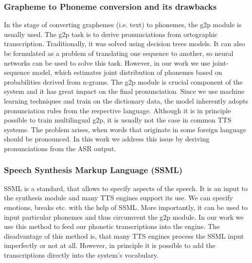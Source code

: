 \subsubsection*{Grapheme to Phoneme conversion and its drawbacks}
In the stage of converting graphemes (i.e. text) to phonemes, the g2p module is usually used.
The g2p task is to derive pronunciations from ortographic transcription.
Traditionally, it was solved using decision trees models.
It can also be formulated as a problem of translating one sequence to another, so neural networks can be used to solve this task\cite{yao2015sequence}.
However, in our work we use joint-sequence model\cite{bisani2008joint}, which estimates joint distribution of phonemes based on probabilities derived from n-grams.
The g2p module is crucial component of the system and it has great impact on the final pronunciation.
Since we use machine learning techniques and train on the dictionary data, the model inherently adopts pronunciation rules from the respective language.
Although it is in principle possible to  train multilingual g2p\cite{schlippe2012grapheme}, it is usually not the case in common TTS systems.
The problem arises, when words that originate in some foreign language should be pronounced.
In this work we address this issue by deriving pronunciations from the ASR output.
\subsubsection*{Speech Synthesis Markup Language (SSML)\cite{taylor1997ssml}}
SSML is a standard, that allows to specify aspects of the speech.
It is an input to the synthesis module and many TTS engines support its use.
We can specify emotions, breaks etc. with the help of SSML.
More importantly, it can be used to input particular phonemes and thus circumvent the g2p module.
In our work we use this method to feed our phonetic transcriptions into the engine.
The disadvantage of this method is, that many TTS engines process the SSML input imperfectly or not at all.
However, in principle it is possible to add the transcriptions directly into the system's vocabulary.
